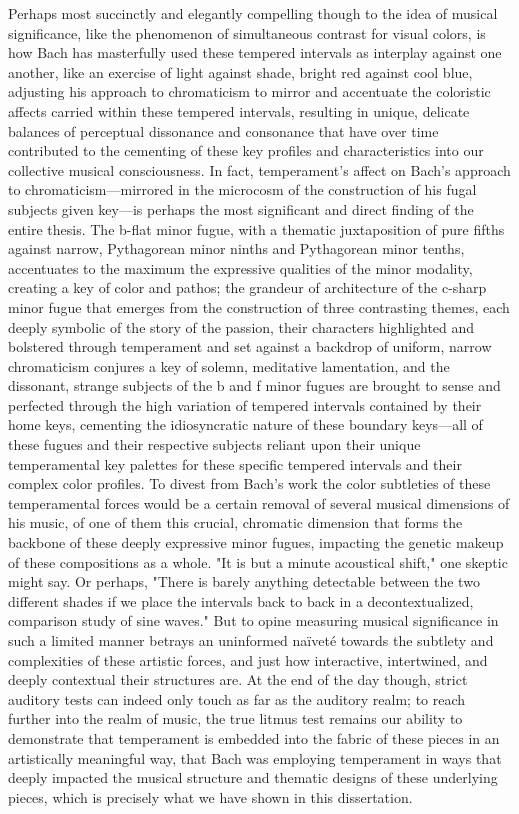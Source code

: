 Perhaps most succinctly and elegantly compelling though to the idea of
musical significance, like the phenomenon of simultaneous contrast for
visual colors, is how Bach has masterfully used these tempered intervals
as interplay against one another, like an exercise of light against
shade, bright red against cool blue, adjusting his approach to
chromaticism to mirror and accentuate the coloristic affects carried
within these tempered intervals, resulting in unique, delicate balances
of perceptual dissonance and consonance that have over time contributed
to the cementing of these key profiles and characteristics into our
collective musical consciousness. In fact, temperament's affect on
Bach's approach to chromaticism---mirrored in the microcosm of the
construction of his fugal subjects given key---is perhaps the most
significant and direct finding of the entire thesis. The b-flat minor
fugue, with a thematic juxtaposition of pure fifths against narrow,
Pythagorean minor ninths and Pythagorean minor tenths, accentuates to
the maximum the expressive qualities of the minor modality, creating a
key of color and pathos; the grandeur of architecture of the c-sharp
minor fugue that emerges from the construction of three contrasting
themes, each deeply symbolic of the story of the passion, their
characters highlighted and bolstered through temperament and set against
a backdrop of uniform, narrow chromaticism conjures a key of solemn,
meditative lamentation, and the dissonant, strange subjects of the b and
f minor fugues are brought to sense and perfected through the high
variation of tempered intervals contained by their home keys, cementing
the idiosyncratic nature of these boundary keys---all of these
fugues and their respective subjects reliant upon their unique
temperamental key palettes for these specific tempered intervals and
their complex color profiles. To divest from Bach's work the color
subtleties of these temperamental forces would be a certain removal of
several musical dimensions of his music, of one of them this crucial,
chromatic dimension that forms the backbone of these deeply expressive
minor fugues, impacting the genetic makeup of these compositions as a
whole. "It is but a minute acoustical shift," one skeptic might say. Or
perhaps, "There is barely anything detectable between the two different
shades if we place the intervals back to back in a decontextualized,
comparison study of sine waves." But to opine measuring musical
significance in such a limited manner betrays an uninformed naïveté
towards the subtlety and complexities of these artistic forces, and just
how interactive, intertwined, and deeply contextual their structures
are. At the end of the day though, strict auditory tests can indeed only
touch as far as the auditory realm; to reach further into the realm of
music, the true litmus test remains our ability to demonstrate that
temperament is embedded into the fabric of these pieces in an
artistically meaningful way, that Bach was employing temperament in ways
that deeply impacted the musical structure and thematic designs of these
underlying pieces, which is precisely what we have shown in this
dissertation.

